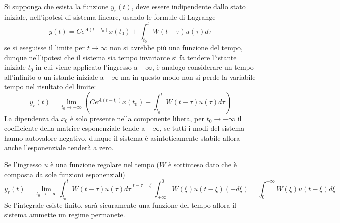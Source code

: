 Si supponga che esista la funzione $y_r(t)$, deve essere
indipendente dallo stato iniziale, nell'ipotesi di sistema lineare, usando le
formule di Lagrange
$$
y(t) = Ce^{A(t-t_0)}x(t_0)+\int_{t_0}^t
W(t-\tau)u(\tau)d\tau
$$
se si eseguisse il limite per $t\to \infty$ non si avrebbe più una funzione del
tempo, dunque nell'ipotesi che il sistema sia tempo invariante
si fa tendere l'istante iniziale $t_0$ in cui viene applicato l'ingresso a
$-\infty$, è analogo considerare un tempo all'infinito o un istante iniziale a
$-\infty$ ma in questo modo non si perde la variabile tempo nel risultato del
limite:
$$
y_r(t) = \lim_{t_0\to-\infty} \left(Ce^{A(t-t_0)}x(t_0)+\int_{t_0}^t
W(t-\tau)u(\tau)d\tau\right)
$$
La dipendenza da $x_0$ è solo presente nella componente libera, per $t_0\to
-\infty$ il coefficiente della matrice esponenziale tende a $+\infty$, se tutti
i modi del sistema hanno autovalore negativo, dunque il sistema è
asintoticamente stabile allora anche l'esponenziale tenderà a zero.

Se l'ingresso $u$ è una funzione regolare nel tempo ($W$ è sottinteso dato che
è composta da sole funzioni esponenziali)
$$
y_r(t) = \lim_{t_0\to -\infty} \int_{t_0}^t W(t-\tau) u(\tau)d\tau
\stackrel{t-\tau = \xi}{=} \int_{+\infty}^{0}W(\xi)u(t-\xi)(-d\xi) =
\int_0^{+\infty} W(\xi)u(t-\xi)d\xi
$$
Se l'integrale esiste finito, sarà sicuramente una funzione del tempo allora il
sistema ammette un regime permanete.
